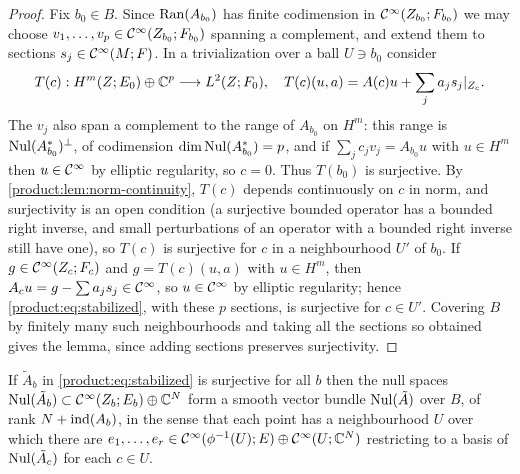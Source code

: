 \begin{proof}
Fix $b_0\in B$. Since $\operatorname{Ran}(A_{b_0})$ has finite codimension in
$\mathcal{C}^\infty(Z_{b_0};F_{b_0})$ we may choose $v_1,\dots,v_p\in\mathcal{C}^\infty(Z_{b_0};F_{b_0})$
spanning a complement, and extend them to sections $s_j\in\mathcal{C}^\infty(M;F)$. In a
trivialization over a ball $U\ni b_0$ consider
\begin{equation*}
T(c):H^m(Z;E_0)\oplus\mathbb{C}^p\longrightarrow L^2(Z;F_0),\quad
T(c)(u,a)=A(c)u+\sum_ja_js_j|_{Z_c}.
\end{equation*}
The $v_j$ also span a complement to the range of $A_{b_0}$ on $H^m$: this
range is $\operatorname{Nul}(A^*_{b_0})^\perp$, of codimension $\dim\operatorname{Nul}(A_{b_0}^*)=p$, and if
$\sum_jc_jv_j=A_{b_0}u$ with $u\in H^m$ then $u\in\mathcal{C}^\infty$ by elliptic regularity, so
$c=0$. Thus $T(b_0)$ is surjective. By
\cref{product:lem:norm-continuity}, $T(c)$ depends continuously on $c$ in norm,
and surjectivity is an open condition (a surjective bounded operator has a
bounded right inverse, and small perturbations of an operator with a bounded
right inverse still have one), so $T(c)$ is surjective for $c$ in a
neighbourhood $U'$ of $b_0$. If $g\in\mathcal{C}^\infty(Z_c;F_c)$ and $g=T(c)(u,a)$ with $u\in
H^m$, then $A_cu=g-\sum a_js_j\in\mathcal{C}^\infty$, so $u\in\mathcal{C}^\infty$ by elliptic regularity;
hence \eqref{product:eq:stabilized}, with these $p$ sections, is surjective for
$c\in U'$. Covering $B$ by finitely many such neighbourhoods and taking all the
sections so obtained gives the lemma, since adding sections preserves
surjectivity.
\end{proof}

\begin{proposition}\label{product:prop:null-bundle}
If $\tilde A_b$ in \eqref{product:eq:stabilized} is surjective for all $b$ then
the null spaces $\operatorname{Nul}(\tilde A_b)\subset\mathcal{C}^\infty(Z_b;E_b)\oplus\mathbb{C}^N$ form a smooth
vector bundle $\operatorname{Nul}(\tilde A)$ over $B$, of rank $N+\operatorname{ind}(A_b)$, in the sense that
each point has a neighbourhood $U$ over which there are
$e_1,\dots,e_r\in\mathcal{C}^\infty(\phi^{-1}(U);E)\oplus\mathcal{C}^\infty(U;\mathbb{C}^N)$ restricting to a basis of
$\operatorname{Nul}(\tilde A_c)$ for each $c\in U$.
\end{proposition}

